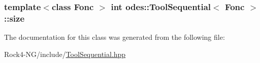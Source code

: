 \hypertarget{classodes_1_1ToolSequential_a43153d094b10b73072739d6e97ba86ad}{
\subsubsection[{size}]{\setlength{\rightskip}{0pt plus 5cm}template$<$class Fonc $>$ int {\bf odes\-::\-Tool\-Sequential}$<$ Fonc $>$\-::size\hspace{0.3cm}{\ttfamily [private]}}}\label{classodes_1_1ToolSequential_a43153d094b10b73072739d6e97ba86ad}


The documentation for this class was generated from the following file\-:\begin{DoxyCompactItemize}
\item 
Rock4-\/\-N\-G/include/\hyperlink{ToolSequential_8hpp}{Tool\-Sequential.\-hpp}\end{DoxyCompactItemize}
